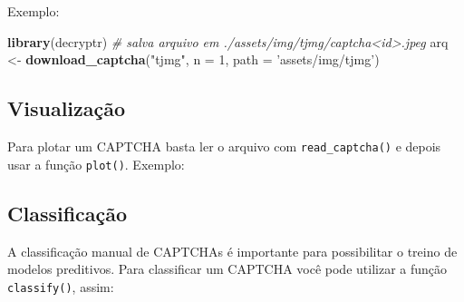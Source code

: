 \documentclass[12pt,]{report}
\newenvironment{Shaded}{\begin{snugshade}}{\end{snugshade}}
\newcommand{\CommentTok}[1]{\textcolor[rgb]{0.56,0.35,0.01}{\textit{#1}}}
\newcommand{\DataTypeTok}[1]{\textcolor[rgb]{0.13,0.29,0.53}{#1}}
\newcommand{\DecValTok}[1]{\textcolor[rgb]{0.00,0.00,0.81}{#1}}
\newcommand{\KeywordTok}[1]{\textcolor[rgb]{0.13,0.29,0.53}{\textbf{#1}}}
\newcommand{\NormalTok}[1]{#1}
\newcommand{\OperatorTok}[1]{\textcolor[rgb]{0.81,0.36,0.00}{\textbf{#1}}}
\newcommand{\StringTok}[1]{\textcolor[rgb]{0.31,0.60,0.02}{#1}}
\begin{document}
Exemplo:

\begin{Shaded}
\begin{Highlighting}[]
\KeywordTok{library}\NormalTok{(decryptr)}
\CommentTok{# salva arquivo em ./assets/img/tjmg/captcha<id>.jpeg}
\NormalTok{arq <-}\StringTok{ }\KeywordTok{download_captcha}\NormalTok{(}\StringTok{"tjmg"}\NormalTok{, }\DataTypeTok{n =} \DecValTok{1}\NormalTok{, }\DataTypeTok{path =} \StringTok{'assets/img/tjmg'}\NormalTok{) }
\end{Highlighting}
\end{Shaded}

\hypertarget{visualizauxe7uxe3o}{%
\subsection{Visualização}\label{visualizauxe7uxe3o}}

Para plotar um CAPTCHA basta ler o arquivo com \texttt{read\_captcha()} e depois usar a função \texttt{plot()}. Exemplo:

\begin{Shaded}
\end{Shaded}

\hypertarget{classificauxe7uxe3o}{%
\subsection{Classificação}\label{classificauxe7uxe3o}}

A classificação manual de CAPTCHAs é importante para possibilitar o treino de modelos preditivos. Para classificar um CAPTCHA você pode utilizar a função \texttt{classify()}, assim:

\begin{Shaded}
\end{Shaded}
\end{document}

